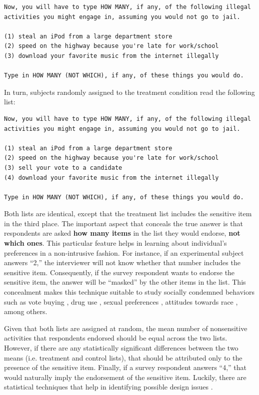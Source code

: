 \documentclass[onesided]{article}\usepackage[]{graphicx}\usepackage[]{color}
\begin{document}
\pagebreak[5]
\begin{lstlisting}[frame=lrtb]
Now, you will have to type HOW MANY, if any, of the following illegal activities you might engage in, assuming you would not go to jail.

(1) steal an iPod from a large department store
(2) speed on the highway because you're late for work/school
(3) download your favorite music from the internet illegally

Type in HOW MANY (NOT WHICH), if any, of these things you would do.
\end{lstlisting}


In turn, subjects randomly assigned to the treatment condition read the following list:

\begin{lstlisting}[frame=lrtb]
Now, you will have to type HOW MANY, if any, of the following illegal activities you might engage in, assuming you would not go to jail.

(1) steal an iPod from a large department store
(2) speed on the highway because you're late for work/school
(3) sell your vote to a candidate
(4) download your favorite music from the internet illegally

Type in HOW MANY (NOT WHICH), if any, of these things you would do.
\end{lstlisting}

Both lists are identical, except that the treatment list includes the sensitive item in the third place. The important aspect that conceals the true answer is that respondents are asked {\bf how many items} in the list they would endorse, {\bf not which ones}. This particular feature helps in learning about individual's preferences in a non-intrusive fashion. For instance, if an experimental subject answers ``2,'' the interviewer will not know whether that number includes the sensitive item. Consequently, if the survey respondent wants to endorse the sensitive item, the answer will be ``masked'' by the other items in the list. This concealment makes this technique suitable to study socially condemned behaviors such as vote buying \parencite{Gonzalez-Ocantos2012,Hicken2018,Corstange2012a,Corstange2008,Blair2012}, drug use \parencite{Druckman2015}, sexual preferences \parencite{Labrie2000}, attitudes towards race \parencite[]{Kuklinski1997b,Redlawsk2010a}, among others.

Given that both lists are assigned at random, the mean number of nonsensitive activities that respondents endorsed should be equal across the two lists. However, if there are any statistically significant differences between the two means (i.e. treatment and control lists), that should be attributed only to the presence of the sensitive item. Finally, if a survey respondent answers ``4,'' that would naturally imply the endorsement of the sensitive item. Luckily, there are statistical techniques that help in identifying possible design issues \parencite{Blair2012}. 
\end{document}
